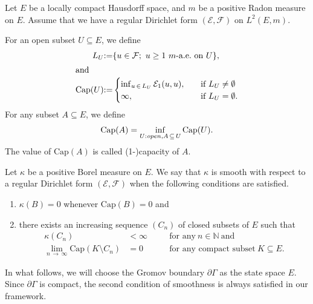 \documentclass[AHL,Unicode,longabstracts,published]{cedram}
\newcommand{\ce}{\mathcal{E}}
\newcommand{\cf}{\mathcal{F}}
\newcommand{\bn}{\mathbb{N}}
\newcommand{\Capp}{\mathrm{Cap}}
\begin{document}
Let $E$ be a locally compact Hausdorff space, and $m$ be a positive Radon measure on $E$. Assume that we have a regular Dirichlet form $(\ce,\cf)$ on $L^2(E,m)$.
\begin{defi}
For an open subset $U\subseteq E$, we define
\begin{align*}
L_U &{:=}\{u\in\cf;\ u\geq1\ m\mathchar`-\text{a.e.\ on}\ U\},
\\
\intertext{and}
\Capp(U)&{:=}
\begin{cases}
\inf_{u\,\in\,L_U}\ce_1(u,u),\quad &\text{if}\ L_U\neq\emptyset\\
\infty,\ &\text{if}\ L_U=\emptyset.
\end{cases}
\end{align*}
For any subset $A\subseteq E$, we define
\begin{align*}
\Capp(A)=\inf_{U:{\textit open}, A\,\subseteq\,U}\Capp(U).
\end{align*}
The value of $\Capp(A)$ is called (1-)capacity of $A$.
\end{defi}

\begin{defi}\label{sm-measure}
Let $\kappa$ be a positive Borel measure on $E$. We say that $\kappa$ is smooth with respect to a regular Dirichlet form $(\ce,\cf)$ when the following conditions are satisfied.
\begin{enumerate}
\item\label{defi6.5.1} $\kappa(B)=0$ whenever $\Capp(B)=0$ and
\item\label{defi6.5.2} there exists an increasing sequence $(C_n)$ of closed subsets of $E$ such that
\begin{align*}
\kappa(C_n)&<\infty\quad &&\text{for\ any}\ n\in\bn\ \text{and}\\
\lim_{n\,\to\,\infty}\Capp(K\setminus C_n)&=0\quad &&\text{for\ any\ compact\ subset}\ K\subseteq E.
\end{align*}
\end{enumerate}
\end{defi}

\begin{rema}\label{rem-cpt}
In what follows, we will choose the Gromov boundary $\partial\Gamma$ as the state space $E$. Since $\partial\Gamma$ is compact, the second condition of smoothness is always satisfied in our framework.
\end{rema}
\end{document}
